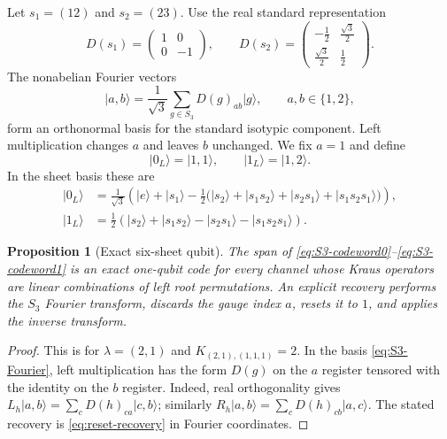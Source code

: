 \documentclass[11pt]{article}
\newtheorem{proposition}[theorem]{Proposition}
\theoremstyle{definition}
\theoremstyle{remark}
\newcommand{\ket}[1]{\lvert #1\rangle}
\begin{document}
Let $s_1=(12)$ and $s_2=(23)$.  Use the real standard representation
\begin{equation}\label{eq:S3-standard-matrices}
 D(s_1)=
 \begin{pmatrix}1&0\\0&-1\end{pmatrix},
 \qquad
 D(s_2)=
 \begin{pmatrix}-\frac12&\frac{\sqrt3}{2}\\[2pt]
 \frac{\sqrt3}{2}&\frac12\end{pmatrix}.
\end{equation}
The nonabelian Fourier vectors
\begin{equation}\label{eq:S3-Fourier}
 \ket{a,b}
 =\frac1{\sqrt3}\sum_{g\in S_3}D(g)_{ab}\ket{g},
 \qquad a,b\in\{1,2\},
\end{equation}
form an orthonormal basis for the standard isotypic component.  Left multiplication changes $a$ and leaves $b$ unchanged.  We fix $a=1$ and define
\begin{equation}\label{eq:S3-codewords-abstract}
 \ket{0_L}=\ket{1,1},
 \qquad
 \ket{1_L}=\ket{1,2}.
\end{equation}
In the sheet basis these are
\begin{align}
 \ket{0_L}
 &=\frac1{\sqrt3}\left(
 \ket e+\ket{s_1}
 -\frac12\big(
 \ket{s_2}+\ket{s_1s_2}+\ket{s_2s_1}+\ket{s_1s_2s_1}
 \big)\right),\label{eq:S3-codeword0}\\
 \ket{1_L}
 &=\frac12\left(
 \ket{s_2}+\ket{s_1s_2}
 -\ket{s_2s_1}-\ket{s_1s_2s_1}
 \right).\label{eq:S3-codeword1}
\end{align}

\begin{proposition}[Exact six-sheet qubit]\label{prop:six-sheet-code}
The span of \eqref{eq:S3-codeword0}--\eqref{eq:S3-codeword1} is an exact one-qubit code for every channel whose Kraus operators are linear combinations of left root permutations.  An explicit recovery performs the $S_3$ Fourier transform, discards the gauge index $a$, resets it to $1$, and applies the inverse transform.
\end{proposition}

\begin{proof}
This is  for $\lambda=(2,1)$ and $K_{(2,1),(1,1,1)}=2$.  In the basis \eqref{eq:S3-Fourier}, left multiplication has the form $D(g)$ on the $a$ register tensored with the identity on the $b$ register.  Indeed, real orthogonality gives $L_h\ket{a,b}=\sum_c D(h)_{ca}\ket{c,b}$; similarly $R_h\ket{a,b}=\sum_c D(h)_{cb}\ket{a,c}$.  The stated recovery is \eqref{eq:reset-recovery} in Fourier coordinates.
\end{proof}
\end{document}
